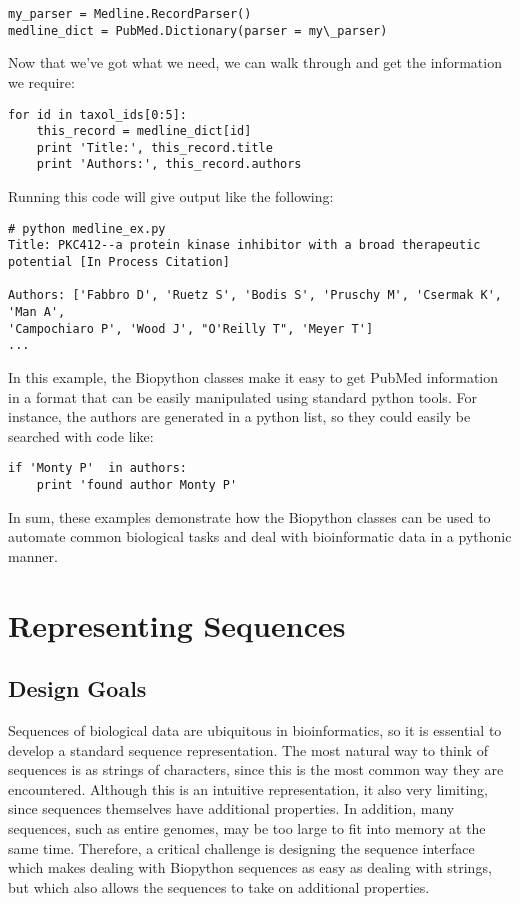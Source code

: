 \documentclass[dvips]{article}
\begin{document}
\begin{verbatim}
my_parser = Medline.RecordParser()
medline_dict = PubMed.Dictionary(parser = my\_parser)
\end{verbatim}

Now that we've got what we need, we can walk through and get the information we require:

\begin{verbatim}
for id in taxol_ids[0:5]:
    this_record = medline_dict[id]
    print 'Title:', this_record.title
    print 'Authors:', this_record.authors

\end{verbatim}

Running this code will give output like the following:

\begin{verbatim}
# python medline_ex.py
Title: PKC412--a protein kinase inhibitor with a broad therapeutic potential [In Process Citation]

Authors: ['Fabbro D', 'Ruetz S', 'Bodis S', 'Pruschy M', 'Csermak K', 'Man A', 
'Campochiaro P', 'Wood J', "O'Reilly T", 'Meyer T']
...
\end{verbatim}


In this example, the Biopython classes make it easy to get PubMed information in a format that can be easily manipulated using standard python tools. For instance, the authors are generated in a python list, so they could easily be searched with code like:

\begin{verbatim}
if 'Monty P'  in authors:
    print 'found author Monty P'
\end{verbatim}

In sum, these examples demonstrate how the Biopython classes can be used to automate common biological tasks and deal with bioinformatic data in a pythonic manner.


\section{Representing Sequences}


\subsection{Design Goals}

Sequences of biological data are ubiquitous in bioinformatics, so it is essential to develop a standard sequence representation. The most natural way to think of sequences is as strings of characters, since this is the most common way they are encountered. Although this is an intuitive representation, it also very limiting, since sequences themselves have additional properties. In addition, many sequences, such as entire genomes, may be too large to fit into memory at the same time. Therefore, a critical challenge is designing the sequence interface which makes dealing with Biopython sequences as easy as dealing with strings, but which also allows the sequences to take on additional properties.
\end{document}
